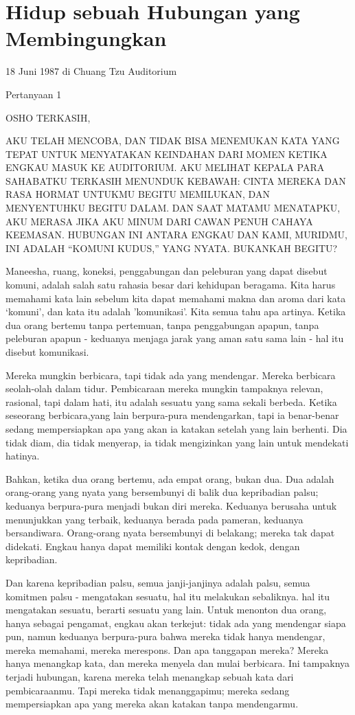 \chapter{Hidup sebuah Hubungan yang Membingungkan}

18 Juni 1987 di Chuang Tzu Auditorium

Pertanyaan 1

OSHO TERKASIH,

AKU TELAH MENCOBA, DAN TIDAK BISA MENEMUKAN KATA YANG TEPAT UNTUK MENYATAKAN KEINDAHAN DARI MOMEN KETIKA ENGKAU MASUK KE AUDITORIUM. AKU MELIHAT KEPALA PARA SAHABATKU TERKASIH MENUNDUK KEBAWAH: CINTA MEREKA DAN RASA HORMAT UNTUKMU BEGITU MEMILUKAN, DAN MENYENTUHKU BEGITU DALAM. DAN SAAT MATAMU MENATAPKU, AKU MERASA JIKA AKU MINUM DARI CAWAN PENUH CAHAYA KEEMASAN. HUBUNGAN INI ANTARA ENGKAU DAN KAMI, MURIDMU, INI ADALAH “KOMUNI KUDUS,” YANG NYATA. BUKANKAH BEGITU?

Maneesha, ruang, koneksi, penggabungan dan peleburan yang dapat disebut komuni, adalah salah satu rahasia besar dari kehidupan beragama. Kita harus memahami kata lain sebelum kita dapat memahami makna dan aroma dari kata ‘komuni’, dan kata itu adalah 'komunikasi'. Kita semua tahu apa artinya. Ketika dua orang bertemu tanpa pertemuan, tanpa penggabungan apapun, tanpa peleburan apapun - keduanya menjaga jarak yang aman satu sama lain - hal itu disebut komunikasi.

Mereka mungkin berbicara, tapi tidak ada yang mendengar. Mereka berbicara seolah-olah dalam tidur. Pembicaraan mereka mungkin tampaknya relevan, rasional, tapi dalam hati, itu adalah sesuatu yang sama sekali berbeda. Ketika seseorang berbicara,yang lain berpura-pura mendengarkan, tapi ia benar-benar sedang mempersiapkan apa yang akan ia katakan setelah yang lain berhenti. Dia tidak diam, dia tidak menyerap, ia tidak mengizinkan yang lain untuk mendekati hatinya.

Bahkan, ketika dua orang bertemu, ada empat orang, bukan dua. Dua adalah orang-orang yang nyata yang bersembunyi di balik dua kepribadian palsu; keduanya berpura-pura menjadi bukan diri mereka. Keduanya berusaha untuk menunjukkan yang terbaik, keduanya berada pada pameran, keduanya bersandiwara. Orang-orang nyata bersembunyi di belakang; mereka tak dapat didekati. Engkau hanya dapat memiliki kontak dengan kedok, dengan kepribadian.

Dan karena kepribadian palsu, semua janji-janjinya adalah palsu, semua komitmen palsu - mengatakan sesuatu, hal itu melakukan sebaliknya. hal itu mengatakan sesuatu, berarti sesuatu yang lain. Untuk menonton dua orang, hanya sebagai pengamat, engkau akan terkejut: tidak ada yang mendengar siapa pun, namun keduanya berpura-pura bahwa mereka tidak hanya mendengar, mereka memahami, mereka merespons. Dan apa tanggapan mereka? Mereka hanya menangkap kata, dan mereka menyela dan mulai berbicara. Ini tampaknya terjadi hubungan, karena mereka telah menangkap sebuah kata dari pembicaraanmu. Tapi mereka tidak menanggapimu; mereka sedang mempersiapkan apa yang mereka akan katakan tanpa mendengarmu.

